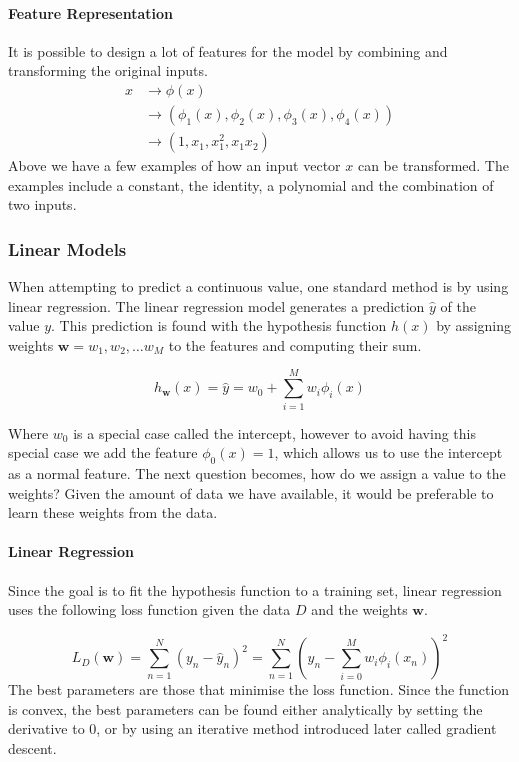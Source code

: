\paragraph{Feature Representation}\label{sec:phi}
It is possible to design a lot of features for the model by combining and transforming the original inputs.
\begin{align*}
x & \rightarrow \phi(x) \\
  & \rightarrow (\phi_1(x), \phi_2(x), \phi_3(x), \phi_4(x)) \\
  & \rightarrow (1, x_1, x_1^2, x_1x_2)
\end{align*} 
Above we have a few examples of how an input vector $x$ can be transformed.
The examples include a constant, the identity, a polynomial and the combination of two inputs.

\subsubsection{Linear Models}

When attempting to predict a continuous value, one standard method is by using linear regression.
The linear regression model generates a prediction $\hat{y}$ of the value $y$. This prediction is found with the hypothesis function $h(x)$ by assigning weights $\textbf{w} = w_1, w_2, \dots w_M$ to the features and computing their sum.

\[h_{\textbf{w}}(x) = \hat{y} = w_0 + \sum_{i=1}^M w_i \phi_i(x) \]

Where $w_0$ is a special case called the intercept, however to avoid having this special case we add the feature $\phi_0(x)=1$, which allows us to use the intercept as a normal feature. 
The next question becomes, how do we assign a value to the weights?
Given the amount of data we have available, it would be preferable to learn these weights from the data. 

\paragraph{Linear Regression}
Since the goal is to fit the hypothesis function to a training set, linear regression uses the following loss function given the data $D$ and the weights $\textbf{w}$.

\[ L_D(\textbf{w}) = \sum_{n=1}^N (y_n-\hat{y}_n)^2 = \sum_{n=1}^N (y_n - \sum_{i=0}^M w_i \phi_i(x_n))^2 \] 
The best parameters are those that minimise the loss function. Since the function is convex, the best parameters can be found either analytically by setting the derivative to 0, or by using an iterative method introduced later called gradient descent.

